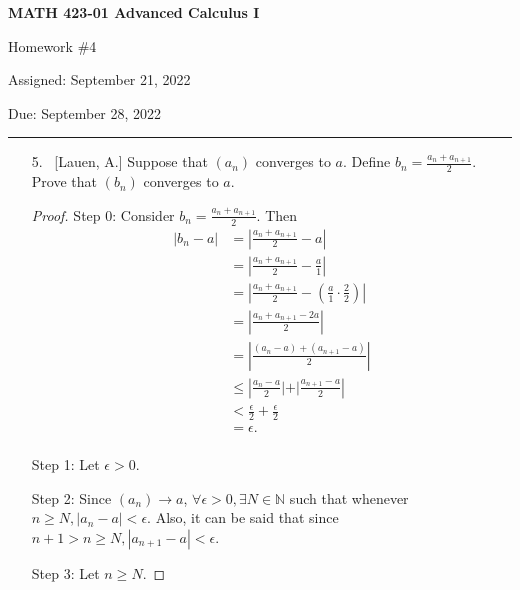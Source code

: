 \documentclass[10pt]{article}
\begin{document}
\pagestyle{empty}  %

\begin{center}  %

{\bf MATH 423-01  Advanced Calculus I

Homework \#4

Assigned: September 21, 2022

Due: September 28, 2022}

\end{center}

\medskip

\hrule   %

\bigskip


\begin{enumerate}
	
\item[5.]  ~[Lauen, A.] Suppose that $(a_n)$ converges to $a$.  Define $b_n = \frac{a_n + a_{n+1}}{2}$.  Prove that $(b_n)$ converges to $a$.
\begin{proof}

Step 0: Consider $b_n = \frac{a_n + a_{n+1}}{2}$.  Then
    \begin{align*}
    |b_n-a| &= |\frac{a_n + a_{n+1}}{2}-a|\\
    &=\left|\frac{a_n + a_{n+1}}{2}-\frac{a}{1}\right|\\
    &=\left|\frac{a_n + a_{n+1}}{2}-(\frac{a}{1}\cdot\frac{2}{2})\right|\\
    &=\left|\frac{a_n+a_{n+1}-2a}{2}\right|\\
    &=\left|\frac{(a_n-a)+(a_{n+1}-a)}{2}\right|\\
    &\leq \left|\frac{a_n-a}{2}|+|\frac{a_{n+1}-a}{2}\right|\\
    &< \frac{\epsilon}{2}+\frac{\epsilon}{2}\\
    &=\epsilon.\\
    \end{align*}

Step 1: Let $\epsilon > 0$.  

Step 2:  Since $(a_n) \rightarrow a$, $\forall \epsilon > 0, \exists N \in \mathbb{N}$ such that whenever $n \geq N, |a_n-a| < \epsilon$. Also, it can be said that since $n+1 > n \geq N, |a_{n+1} - a| < \epsilon$.

Step 3: Let $n \geq N$. 


\end{proof}
\end{enumerate}
\end{document}
